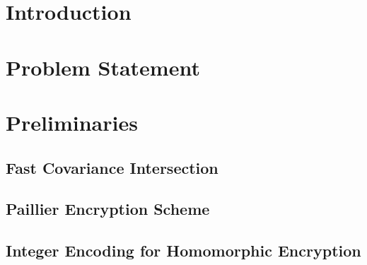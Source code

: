 \documentclass[letterpaper, 10 pt, conference]{ieeeconf}
\begin{document}
\section{Introduction}


% 
%                                              
%                                              
%                                              
% 
\section{Problem Statement}


% 
%                                                                 
%                                                                 
%                                                                 
% 
\section{Preliminaries}

\subsection{Fast Covariance Intersection}

\subsection{Paillier Encryption Scheme}

\subsection{Integer Encoding for Homomorphic Encryption}
\end{document}
